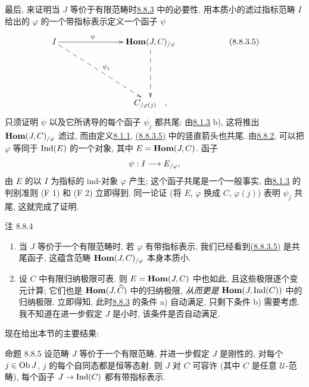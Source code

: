 最后, 来证明当 $J$ 等价于有限范畴时\hyperref[I.prop8.8.3]{8.8.3} 中的必要性.
用本质小的滤过指标范畴 $I$ 给出的 $\varphi$ 的一个带指标表示定义一个函子 $\psi$
\hypertarget{sga4.exp.I.equation.8.8.3.5}{}\[
\xymatrix@C=1.25cm@R=2cm{
 I \ar[rr]^(.4){\psi} \ar@{-->}[rrd]^{\psi_j}&&  \Hhom(J,C)_{/\varphi} \ar@{-->}[d] &\\
                        &     &   C_{/\varphi(j)}\quad ,\\
}\tag{8.8.3.5}
\]
只须证明 $\psi$ 以及它所诱导的每个函子 $\psi_j$ 都共尾:
由\hyperref[I.prop8.1.3]{8.1.3} b), 这将推出 $\operatorname{\mathbf{Hom}}(J,C)_{/\varphi}$ 滤过,
而由定义\hyperref[I.def8.1.1]{8.1.1},
\hyperlink{sga4.exp.I.equation.8.8.3.5}{(8.8.3.5)} 中的竖直箭头也共尾.
由\hyperref[I.prop8.8.2]{8.8.2}, 可以把 $\varphi$ 等同于 $\operatorname{Ind}(E)$ 的一个对象,
其中 $E=\operatorname{\mathbf{Hom}}(J,C)$. 函子
$$
\psi:I\longrightarrow E_{/\varphi}{},
$$
由 $E$ 的以 $I$ 为指标的 ind-对象 $\varphi$ 产生\pageoriginale;
这个函子共尾是一个一般事实, 由\hyperref[I.prop8.1.3]{8.1.3} 的判别准则 (F 1) 和 (F 2) 立即得到.
同一论证 (将 $E$, $\varphi$ 换成 $C$, $\varphi(j)$)
表明 $\psi_j$ 共尾, 这就完成了证明.

\begin{enonce*}[remark]{注 8.8.4}
\begin{enumerate}
\renewcommand{\theenumi}{\alph{enumi}}
\renewcommand{\labelenumi}{\theenumi)}
\item 当 $J$ 等价于一个有限范畴时, 若 $\varphi$ 有带指标表示,
我们已经看到\hyperlink{sga4.exp.I.equation.8.8.3.5}{(8.8.3.5)} 是共尾函子,
这蕴含范畴 $\operatorname{\mathbf{Hom}}(J,C)_{/\varphi}$ 本身本质小.

\item 设 $C$ 中有限归纳极限可表.
则 $E=\operatorname{\mathbf{Hom}}(J,C)$ 中也如此, 且这些极限逐个变元计算;
它们也是 $\operatorname{\mathbf{Hom}}(J,\widehat{C})$ 中的归纳极限,
\textit{从而更是} $\operatorname{\mathbf{Hom}}(J,\operatorname{Ind}(C))$ 中的归纳极限.
立即得知, 此时\hyperref[I.prop8.8.3]{8.8.3} 的条件 a) 自动满足,
只剩下条件 b) 需要考虑. 我不知道在进一步假定 $J$ 是小时, 该条件是否自动满足.
\end{enumerate}
\end{enonce*}
现在给出本节的主要结果:

\begin{enonce*}{命题 8.8.5}
设范畴 $J$ 等价于一个有限范畴, 并进一步假定 $J$ 是刚性的,
\ie 对每个 $j\in \operatorname{Ob} J$, $j$ 的每个自同态都是恒等态射.
则 $J$ 对 $C$ 可容许 (其中 $C$ 是任意 $𝒰$-范畴),
\ie 每个函子 $J\rightarrow \operatorname{Ind}(C)$ 都有带指标表示.
\end{enonce*}

